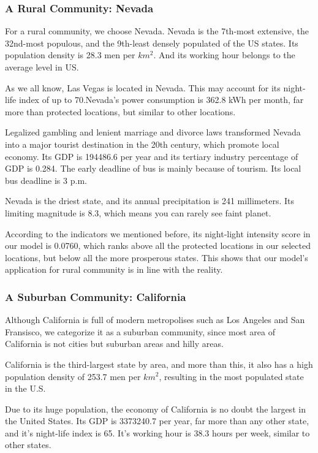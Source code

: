 \subsubsection{A Rural Community: Nevada}
For a rural community, we choose Nevada. Nevada is the 7th-most extensive, the 32nd-most populous, and the 9th-least densely populated of the US states. Its population density is 28.3 men per $km^2$. And its working hour belongs to the average level in US.

As we all know, Las Vegas is located in Nevada. This may account for its night-life index of up to 70.Nevada's power consumption is 362.8 kWh per month, far more than protected locations, but similar to other locations.

Legalized gambling and lenient marriage and divorce laws transformed Nevada into a major tourist destination in the 20th century, which promote local economy. Its GDP is 194486.6 per year and its tertiary industry percentage of GDP is 0.284. The early deadline of bus is mainly because of tourism. Its local bus deadline is 3 p.m.

Nevada is the driest state, and its annual precipitation is 241 millimeters. Its limiting magnitude is 8.3, which means you can rarely see faint planet.

According to the indicators we mentioned before, its night-light intensity score in our model is 0.0760, which ranks above all the protected locations in our selected locations, but below all the more prosperous states. This shows that our model's application for rural community is in line with the reality.

\subsubsection{A Suburban Community: California}
Although California is full of modern metropolises such as Los Angeles and San Fransisco, we categorize it as a suburban community, since most area of California is not cities but suburban areas and hilly areas.

California is the third-largest state by area, and more than this, it also has a high population density of 253.7 men per $km^2$, resulting in the most populated state in the U.S.

Due to its huge population, the economy of California is no doubt the largest in the United States. Its GDP is 3373240.7 per year, far more than any other state, and it's night-life index is 65. It's working hour is 38.3 hours per week, similar to other states.

